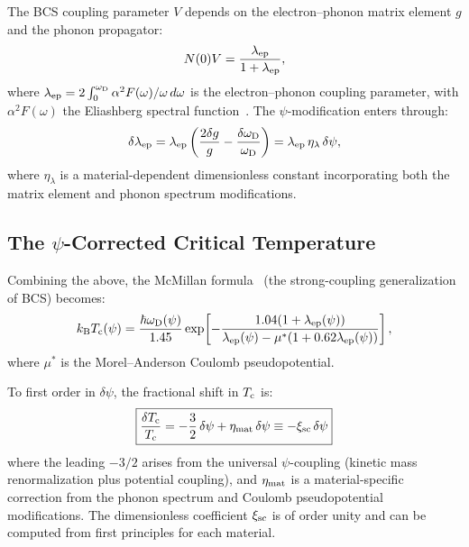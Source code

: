 \documentclass[aps,prb,twocolumn,superscriptaddress,floatfix,nofootinbib,longbibliography]{revtex4-2}
\newcommand{\kB}{k_{\rm B}}
\newcommand{\Tc}{T_{\rm c}}
\newcommand{\wD}{\omega_{\rm D}}
\begin{document}
The BCS coupling parameter $V$ depends on the electron--phonon matrix
element $g$ and the phonon propagator:
\begin{equation}
N(0)V = \frac{\lambda_{\rm ep}}{1 + \lambda_{\rm ep}},
\label{eq:NV}
\end{equation}
where $\lambda_{\rm ep} = 2\int_0^{\wD}\alpha^2F(\omega)/\omega\,d\omega$
is the electron--phonon coupling parameter, with $\alpha^2F(\omega)$ the
Eliashberg spectral function~\cite{Eliashberg1960}.  The
$\psi$-modification enters through:
\begin{equation}
\delta\lambda_{\rm ep} = \lambda_{\rm ep}\left(\frac{2\delta g}{g}
- \frac{\delta\wD}{\wD}\right) = \lambda_{\rm ep}\,\eta_\lambda\,\delta\psi,
\label{eq:lambda-ep-shift}
\end{equation}
where $\eta_\lambda$ is a material-dependent dimensionless constant
incorporating both the matrix element and phonon spectrum modifications.

\subsection{The $\psi$-Corrected Critical Temperature}

Combining the above, the McMillan formula~\cite{McMillan1968} (the
strong-coupling generalization of BCS) becomes:
\begin{equation}
\kB\Tc(\psi) = \frac{\hbar\wD(\psi)}{1.45}\exp\!\left[
-\frac{1.04(1 + \lambda_{\rm ep}(\psi))}
{\lambda_{\rm ep}(\psi) - \mu^*(1 + 0.62\lambda_{\rm ep}(\psi))}
\right],
\label{eq:mcmillan-psi}
\end{equation}
where $\mu^*$ is the Morel--Anderson Coulomb pseudopotential.

To first order in $\delta\psi$, the fractional shift in $\Tc$ is:
\begin{equation}
\boxed{
\frac{\delta\Tc}{\Tc} = -\frac{3}{2}\,\delta\psi
+ \eta_{\rm mat}\,\delta\psi
\equiv -\xi_{\rm sc}\,\delta\psi
}
\label{eq:tc-shift}
\end{equation}
where the leading $-3/2$ arises from the universal $\psi$-coupling
(kinetic mass renormalization plus potential coupling), and
$\eta_{\rm mat}$ is a material-specific correction from the phonon
spectrum and Coulomb pseudopotential modifications.  The dimensionless
coefficient $\xi_{\rm sc}$ is of order unity and can be computed from
first principles for each material.
\end{document}
